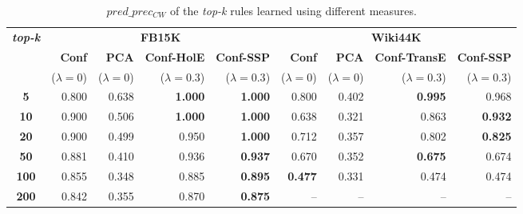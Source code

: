\setlength\tabcolsep{0.2em}
\begin{table}[t]
\scriptsize
\centering
\begin{tabular}{c |r r r r |r r r r} 
 \multirow{3}{*}{\textbf{\textit{top-k}}} & \multicolumn{4}{c}{\textbf{FB15K}} & \multicolumn{4}{|c}{\textbf{Wiki44K}} \\
 \cmidrule{2-9}
 & \textbf{Conf}&  \textbf{PCA} & \textbf{Conf-HolE}& \textbf{Conf-SSP} &  \textbf{Conf}&  \textbf{PCA} & \textbf{Conf-TransE}& \textbf{Conf-SSP}\\
  & {\scriptsize($\lambda=0$)}  & {\scriptsize($\lambda=0$)} & {\scriptsize($\lambda=0.3$)} & {\scriptsize($\lambda=0.3$)} & {\scriptsize($\lambda=0$)} & {\scriptsize($\lambda=0$)} &{\scriptsize($\lambda=0.3$)} & {\scriptsize($\lambda=0.3$)}\\
 \midrule
 \textbf{5} & 0.800 & 0.638 & \textbf{1.000} & \textbf{1.000} & 0.800 & 0.402 & \textbf{0.995} & 0.968\\
\textbf{10} & 0.900 & 0.506 & \textbf{1.000} & \textbf{1.000} & 0.638 & 0.321 & 0.863 & \textbf{0.932} \\
\textbf{20} & 0.900 & 0.499 & 0.950 & \textbf{1.000} & 0.712 & 0.357 & 0.802 & \textbf{0.825}\\
\textbf{50} & 0.881 & 0.410 & 0.936 & \textbf{0.937} & 0.670 & 0.352 & \textbf{0.675} & 0.674 \\
\textbf{100} & 0.855 & 0.348 & 0.885 & \textbf{0.895} & \textbf{0.477} & 0.331 & 0.474 & 0.474\\
\textbf{200} & 0.842 & 0.355 & 0.870 & \textbf{0.875} & -- & -- & -- & -- \\
 \bottomrule
\end{tabular}
\caption{$pred\_prec_{CW}$ of the \textit{top-k} rules learned using different measures.}
\label{table:avg_quality}
\vspace*{-3mm}
\end{table}
